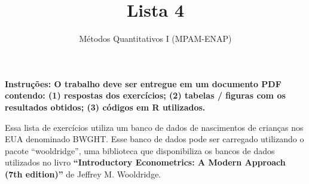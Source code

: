 \documentclass[a4paper, 12pt, final]{article}
\title{\textbf{Lista 4}}
\author{Métodos Quantitativos I (MPAM-ENAP)}
\date{}
\begin{document}
\maketitle

\textbf{Instruções: O trabalho deve ser entregue em um documento PDF contendo: (1) respostas dos exercícios; (2) tabelas / figuras com os resultados obtidos; (3) códigos em R utilizados.} 

\vspace{11pt}

Essa lista de exercícios utiliza um banco de dados de nascimentos de crianças nos EUA denominado BWGHT. Esse banco de dados pode ser carregado utilizando o pacote ``wooldridge'', uma biblioteca que disponibiliza os bancos de dados utilizados no livro \textbf{``Introductory Econometrics: A Modern Approach (7th edition)''} de Jeffrey M. Wooldridge.   
\end{document}

